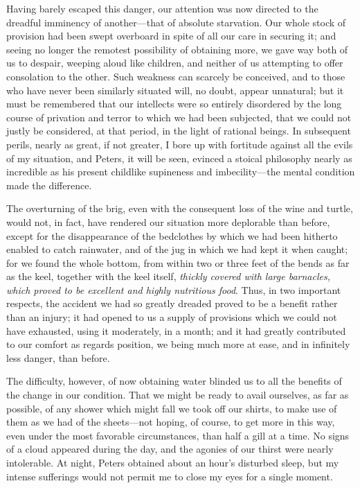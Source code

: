 Having barely escaped this danger, our attention was now directed to the
dreadful imminency of another---that of absolute starvation. Our whole stock of
provision had been swept overboard in spite of all our care in securing it; and
seeing no longer the remotest possibility of obtaining more, we gave way both of
us to despair, weeping aloud like children, and neither of us attempting to
offer consolation to the other. Such weakness can scarcely be conceived, and to
those who have never been similarly situated will, no doubt, appear unnatural;
but it must be remembered that our intellects were so entirely disordered by the
long course of privation and terror to which we had been subjected, that we
could not justly be considered, at that period, in the light of rational beings.
In subsequent perils, nearly as great, if not greater, I bore up with fortitude
against all the evils of my situation, and Peters, it will be seen, evinced a
stoical philosophy nearly as incredible as his present childlike supineness and
imbecility---the mental condition made the difference. 

The overturning of the brig, even with the consequent loss of the wine and
turtle, would not, in fact, have rendered our situation more deplorable than
before, except for the disappearance of the bedclothes by which we had been
hitherto enabled to catch rainwater, and of the jug in which we had kept it when
caught; for we found the whole bottom, from within two or three feet of the
bends as far as the keel, together with the keel itself, \emph{thickly covered with
large barnacles, which proved to be excellent and highly nutritious food}.
Thus, in two important respects, the accident we had so greatly dreaded proved
to be a benefit rather than an injury; it had opened to us a supply of
provisions which we could not have exhausted, using it moderately, in a month;
and it had greatly contributed to our comfort as regards position, we being much
more at ease, and in infinitely less danger, than before. 

The difficulty, however, of now obtaining water blinded us to all the
benefits of the change in our condition. That we might be ready to avail
ourselves, as far as possible, of any shower which might fall we took off our
shirts, to make use of them as we had of the sheets---not hoping, of course, to
get more in this way, even under the most favorable circumstances, than half a
gill at a time. No signs of a cloud appeared during the day, and the agonies of
our thirst were nearly intolerable. At night, Peters obtained about an hour's
disturbed sleep, but my intense sufferings would not permit me to close my eyes
for a single moment. 

